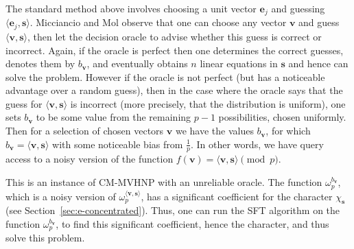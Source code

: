 \documentclass[11pt]{article}
\theoremstyle{definition}
\newcommand{\Z}{\mathbb{Z}}
\begin{document}
The standard method above involves choosing a unit vector $\textbf{e}_{j}$ and guessing $\langle \textbf{e}_{j},\textbf{s} \rangle$.
Micciancio and Mol observe that one can choose any vector $\textbf{v}$ and guess $\langle \textbf{v},\textbf{s} \rangle$, then let the decision oracle to advise whether this guess is correct or incorrect.
Again, if the oracle is perfect then one determines the correct guesses, denotes them by $b_\textbf{v}$, and eventually obtains $n$ linear equations in $\textbf{s}$ and hence can solve the problem. However if the oracle is not perfect (but has a noticeable advantage over a random guess), then in the case where the oracle says that the guess for $\langle \textbf{v},\textbf{s} \rangle$ is incorrect (more precisely, that the distribution is uniform), one sets $b_\textbf{v}$ to be some value from the remaining $p-1$ possibilities, chosen uniformly. Then for a selection of chosen vectors $\textbf{v}$ we have the values $b_\textbf{v}$, for which $b_\textbf{v} = \langle \textbf{v},\textbf{s} \rangle$ with some noticeable bias from $\frac{1}{p}$. In other words, we have query access to a noisy version of the function $f( \textbf{v} ) = \langle \textbf{v},\textbf{s} \rangle \pmod{p}$.

This is an instance of CM-MVHNP with an unreliable oracle. The function $\omega_p^{b_\textbf{v}}$, which is a noisy version of $\omega_p^{\langle \textbf{v},\textbf{s} \rangle}$, has a significant coefficient for the character $\chi_\textbf{s}$ (see Section~\ref{sec:e-concentrated}). Thus, one can run the SFT algorithm on the function $\omega_p^{b_\textbf{v}}$, to find this significant coefficient, hence the character, and thus solve this problem.
\end{document}
